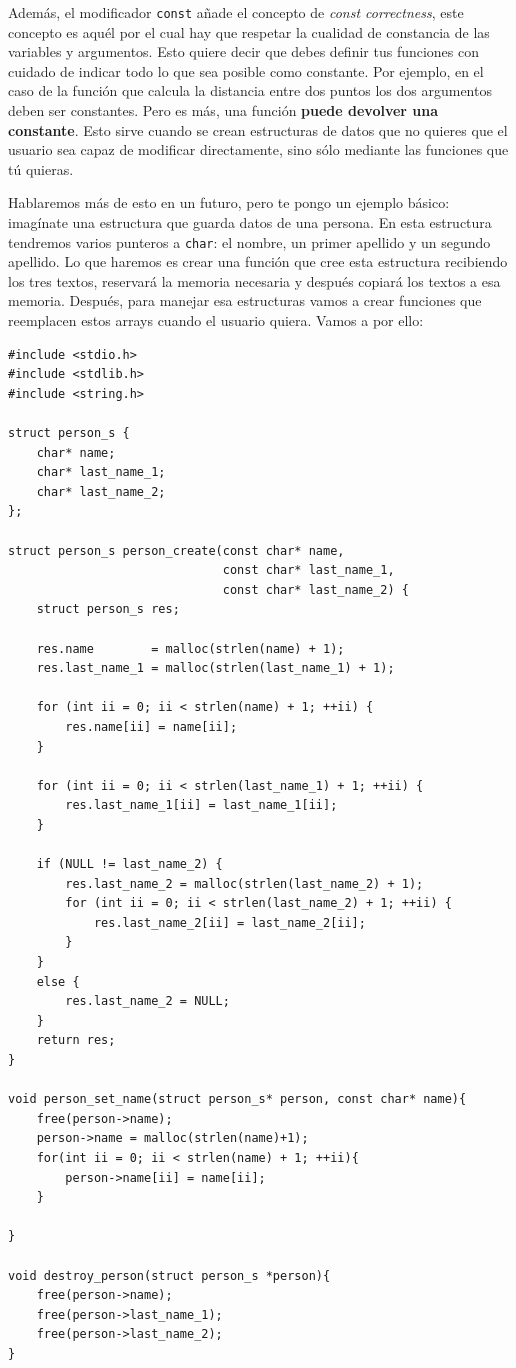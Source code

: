 \documentclass[a4paper]{article}
\begin{document}
Además, el modificador \verb!const! añade el concepto de
\textit{const correctness}, este concepto es aquél por el cual hay que respetar
la cualidad de constancia de las variables y argumentos. Esto quiere decir que
debes definir tus funciones con cuidado de indicar todo lo que sea posible
como constante. Por ejemplo, en el caso de la función que calcula la distancia
entre dos puntos los dos argumentos deben ser constantes. Pero es más, una
función \textbf{puede devolver una constante}. Esto sirve cuando se crean
estructuras de datos que no quieres que el usuario sea capaz de modificar
directamente, sino sólo mediante las funciones que tú quieras.

Hablaremos más de esto en un futuro, pero te pongo un ejemplo básico:
imagínate una estructura que guarda datos de una persona.
En esta estructura
tendremos varios punteros a \verb!char!: el nombre, un primer apellido y un
segundo apellido. Lo que haremos es crear una función que cree esta estructura
recibiendo los tres textos, reservará la memoria necesaria y después copiará
los textos a esa memoria. Después, para manejar esa estructuras vamos a crear
funciones que reemplacen estos arrays cuando el usuario quiera. Vamos a por
ello:

\noindent
\begin{minipage}[H]{\linewidth}
\mbox{}
\begin{lstlisting}[style=C,
caption={Estructura con punteros constantes -- Funciones de manipulación},
label={lst:structConstPointers}]
#include <stdio.h>
#include <stdlib.h>
#include <string.h>

struct person_s {
    char* name;
    char* last_name_1;
    char* last_name_2;
};

struct person_s person_create(const char* name,
                              const char* last_name_1,
                              const char* last_name_2) {
    struct person_s res;

    res.name        = malloc(strlen(name) + 1);
    res.last_name_1 = malloc(strlen(last_name_1) + 1);

    for (int ii = 0; ii < strlen(name) + 1; ++ii) {
        res.name[ii] = name[ii];
    }

    for (int ii = 0; ii < strlen(last_name_1) + 1; ++ii) {
        res.last_name_1[ii] = last_name_1[ii];
    }

    if (NULL != last_name_2) {
        res.last_name_2 = malloc(strlen(last_name_2) + 1);
        for (int ii = 0; ii < strlen(last_name_2) + 1; ++ii) {
            res.last_name_2[ii] = last_name_2[ii];
        }
    }
    else {
        res.last_name_2 = NULL;
    }
    return res;
}

void person_set_name(struct person_s* person, const char* name){
    free(person->name);
    person->name = malloc(strlen(name)+1);
    for(int ii = 0; ii < strlen(name) + 1; ++ii){
        person->name[ii] = name[ii];
    }

}

void destroy_person(struct person_s *person){
    free(person->name);
    free(person->last_name_1);
    free(person->last_name_2);
}
\end{lstlisting}
\end{minipage}
\end{document}
